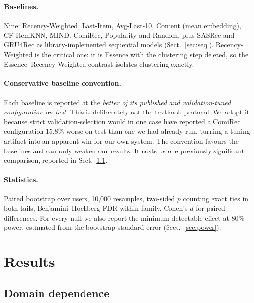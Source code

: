 \documentclass[runningheads]{llncs}
\begin{document}
\paragraph{Baselines.} Nine: Recency-Weighted, Last-Item, Avg-Last-10, Content
(mean embedding), CF-ItemKNN, MIND, ComiRec, Popularity and Random, plus SASRec and
GRU4Rec as library-implemented sequential models (Sect.~\ref{sec:seq}).
Recency-Weighted is the critical one: it is Essence with the clustering step deleted, so
the Essence--Recency-Weighted contrast isolates clustering exactly.

\paragraph{Conservative baseline convention.} Each baseline is reported at the
\emph{better of its published and validation-tuned configuration on test}. This is
deliberately not the textbook protocol. We adopt it because strict validation-selection
would in one case have reported a ComiRec configuration 15.8\% worse on test than one we
had already run, turning a tuning artifact into an apparent win for our own system. The
convention favours the baselines and can only weaken our results. It costs us one
previously significant comparison, reported in Sect.~\ref{sec:domain}.

\paragraph{Statistics.} Paired bootstrap over users, 10{,}000 resamples, two-sided
$p$ counting exact ties in both tails, Benjamini--Hochberg FDR within family, Cohen's $d$
for paired differences. For every null we also report the minimum detectable effect at
80\% power, estimated from the bootstrap standard error (Sect.~\ref{sec:power}).

\section{Results}

\subsection{Domain dependence}\label{sec:domain}
\end{document}
